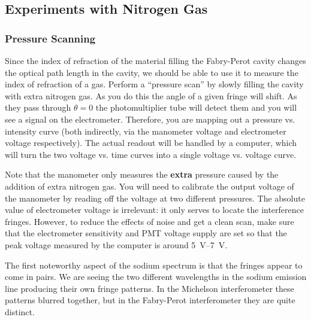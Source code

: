 \documentclass[]{manual}
\begin{document}
    \subsection{Experiments with Nitrogen Gas}

    \subsubsection{Pressure Scanning}
    Since the index of refraction of the material filling the Fabry-Perot cavity changes the optical path length in the cavity, we should be able to use it to measure the index of refraction of a gas.
    Perform a ``pressure scan'' by slowly filling the cavity with extra nitrogen gas.
    As you do this the angle of a given fringe will shift.
    As they pass through $\theta = 0$ the photomultiplier tube will detect them and you will see a signal on the electrometer.
    Therefore, you are mapping out a pressure vs. intensity curve (both indirectly, via the manometer voltage and electrometer voltage respectively).
    The actual readout will be handled by a computer, which will turn the two voltage vs. time curves into a single voltage vs. voltage curve.

    Note that the manometer only measures the \textbf{extra} pressure caused by the addition of extra nitrogen gas.
    You will need to calibrate the output voltage of the manometer by reading off the voltage at two different pressures.
    The absolute value of  electrometer voltage is irrelevant: it only serves to locate the interference fringes.
    However, to reduce the effects of noise and get a clean scan, make sure that the electrometer sensitivity and PMT voltage supply are set so that the peak voltage measured by the computer is around \SIrange{5}{7}{\volt}.


    The first noteworthy aspect of the sodium spectrum is that the fringes appear to come in pairs.
    We are seeing the two different wavelengths in the sodium emission line producing their own fringe patterns.
    In the Michelson interferometer these patterns blurred together, but in the Fabry-Perot interferometer they are quite distinct.
\end{document}
